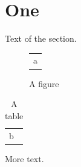 \documentclass{article}
\begin{document}
\listoffigures
\listoftables
\section{One}
Text of the section.
\begin{figure}[h]
\centering
\begin{tabular}{l}
a
\end{tabular}
\caption{A figure}
\end{figure}
\begin{table}[h]
\centering
\begin{tabular}{l}
b
\end{tabular}
\caption{A table}
\end{table}
More text.
\end{document}
